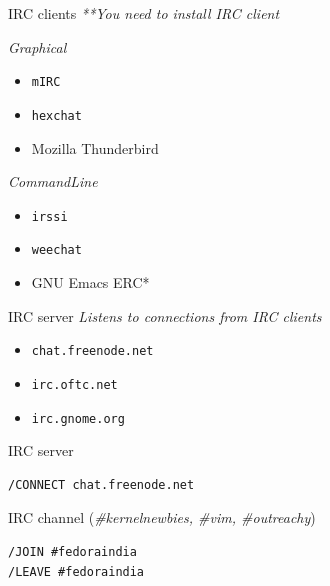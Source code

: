 \documentclass[10pt]{beamer}
\begin{document}
\begin{frame}[fragile,label={sec:org5b849da}]{IRC clients}
 \emph{**You need to install IRC client}

\begin{block}{\emph{Graphical}}
\begin{itemize}
\item \texttt{mIRC}
\item \texttt{hexchat}
\item Mozilla Thunderbird
\end{itemize}
\end{block}

\begin{block}{\emph{CommandLine}}
\begin{itemize}
\item \texttt{irssi}
\item \texttt{weechat}
\item GNU Emacs ERC*
\end{itemize}
\end{block}
\end{frame}

\begin{frame}[fragile,label={sec:orgc2172e8}]{IRC server}
 \emph{Listens to connections from IRC clients}


\begin{itemize}
\item \texttt{chat.freenode.net}
\item \texttt{irc.oftc.net}
\item \texttt{irc.gnome.org}
\end{itemize}
\end{frame}

\begin{frame}[fragile,label={sec:org225764e}]{IRC server}
 \begin{verbatim}
/CONNECT chat.freenode.net
\end{verbatim}
\end{frame}


\begin{frame}[fragile,label={sec:org4b7d5a9}]{IRC channel}
 (\emph{\#kernelnewbies, \#vim, \#outreachy})


\begin{verbatim}
/JOIN #fedoraindia
/LEAVE #fedoraindia
\end{verbatim}
\end{frame}
\end{document}
